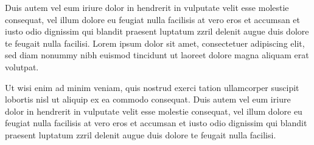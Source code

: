 Duis autem vel eum iriure dolor in hendrerit in vulputate velit esse molestie consequat, vel illum dolore eu feugiat nulla facilisis at vero eros et accumsan et iusto odio dignissim qui blandit praesent luptatum zzril delenit augue duis dolore te feugait nulla facilisi. Lorem ipsum dolor sit amet, consectetuer adipiscing elit, sed diam nonummy nibh euismod tincidunt ut laoreet dolore magna aliquam erat volutpat. 

Ut wisi enim ad minim veniam, quis nostrud exerci tation ullamcorper suscipit lobortis nisl ut aliquip ex ea commodo consequat. Duis autem vel eum iriure dolor in hendrerit in vulputate velit esse molestie consequat, vel illum dolore eu feugiat nulla facilisis at vero eros et accumsan et iusto odio dignissim qui blandit praesent luptatum zzril delenit augue duis dolore te feugait nulla facilisi. 